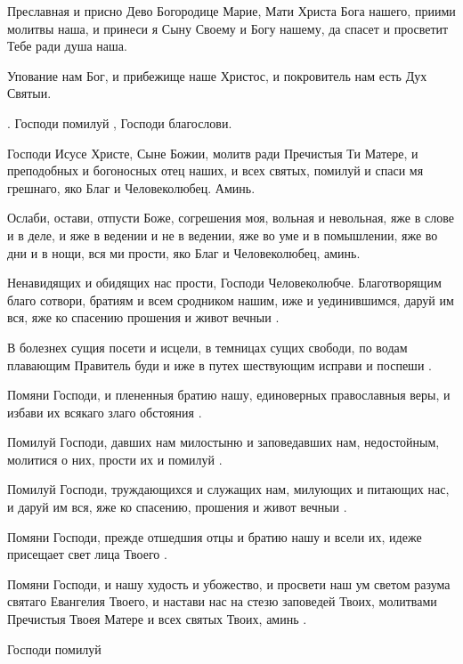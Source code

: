 \begin{mymulticols}
Преславная и присно Дево Богородице Марие, Мати Христа Бога нашего, приими молитвы наша, и принеси я Сыну Своему и Богу нашему, да спасет и просветит Тебе ради душа наша.

Упование нам Бог, и прибежище наше Христос, и покровитель нам есть Дух Святыи.

. Господи помилуй , Господи благослови.


 Господи Исусе Христе, Сыне Божии, молитв ради Пречистыя Ти Матере, и преподобных и богоносных отец наших, и всех святых, помилуй и спаси мя грешнаго, яко Благ и Человеколюбец. Аминь. 

 Ослаби, остави, отпусти Боже, согрешения моя, вольная и невольная, яже в слове и в деле, и яже в ведении и не в ведении, яже во уме и в помышлении, яже во дни и в нощи, вся ми прости, яко Благ и Человеколюбец, аминь.

 Ненавидящих и обидящих нас прости, Господи Человеколюбче. Благотворящим благо сотвори, братиям и всем сродником нашим, иже и уединившимся, даруй им вся, яже ко спасению прошения и живот вечныи .

В болезнех сущия посети и исцели, в темницах сущих свободи, по водам плавающим Правитель буди и иже в путех шествующим исправи и поспеши .

Помяни Господи, и плененныя братию нашу, единоверных православныя веры, и избави их всякаго злаго обстояния .

Помилуй Господи, давших нам милостыню и заповедавших нам, недостойным, молитися о них, прости их и помилуй .

Помилуй Господи, труждающихся и служащих нам, милующих и питающих нас, и даруй им вся, яже ко спасению, прошения и живот вечныи .

Помяни Господи, прежде отшедшия отцы и братию нашу и всели их, идеже присещает свет лица Твоего .

Помяни Господи, и нашу худость и убожество, и просвети наш ум светом разума святаго Евангелия Твоего, и настави нас на стезю заповедей Твоих, молитвами Пречистыя Твоея Матере и всех святых Твоих, аминь .

Господи помилуй 


\end{mymulticols}

